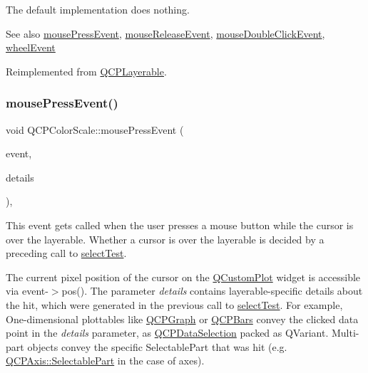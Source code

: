 The default implementation does nothing.

\begin{DoxySeeAlso}{See also}
\hyperlink{class_q_c_p_color_scale_a91f633b97ffcd57fdf8cd814974c20e6}{mouse\+Press\+Event}, \hyperlink{class_q_c_p_color_scale_a6a35dd39ab4e5cb2d7b29ebb4d5b61b0}{mouse\+Release\+Event}, \hyperlink{class_q_c_p_layerable_a4171e2e823aca242dd0279f00ed2de81}{mouse\+Double\+Click\+Event}, \hyperlink{class_q_c_p_color_scale_a63cf19be184f6670c9495ad3a9a1baeb}{wheel\+Event} 
\end{DoxySeeAlso}


Reimplemented from \hyperlink{class_q_c_p_layerable_a9eee1ba47fd69be111059ca3881933e4}{Q\+C\+P\+Layerable}.

\mbox{\label{class_q_c_p_color_scale_a91f633b97ffcd57fdf8cd814974c20e6}} 
\subsubsection{\texorpdfstring{mouse\+Press\+Event()}{mousePressEvent()}}
{\footnotesize\ttfamily void Q\+C\+P\+Color\+Scale\+::mouse\+Press\+Event (\begin{DoxyParamCaption}\item[{Q\+Mouse\+Event $\ast$}]{event,  }\item[{const Q\+Variant \&}]{details }\end{DoxyParamCaption})\hspace{0.3cm}{\ttfamily [protected]}, {\ttfamily [virtual]}}

This event gets called when the user presses a mouse button while the cursor is over the layerable. Whether a cursor is over the layerable is decided by a preceding call to \hyperlink{class_q_c_p_layout_element_ae97f483cccedadbf18ea4525ef240ee4}{select\+Test}.

The current pixel position of the cursor on the \hyperlink{class_q_custom_plot}{Q\+Custom\+Plot} widget is accessible via {\ttfamily event-\/$>$pos()}. The parameter {\itshape details} contains layerable-\/specific details about the hit, which were generated in the previous call to \hyperlink{class_q_c_p_layout_element_ae97f483cccedadbf18ea4525ef240ee4}{select\+Test}. For example, One-\/dimensional plottables like \hyperlink{class_q_c_p_graph}{Q\+C\+P\+Graph} or \hyperlink{class_q_c_p_bars}{Q\+C\+P\+Bars} convey the clicked data point in the {\itshape details} parameter, as \hyperlink{class_q_c_p_data_selection}{Q\+C\+P\+Data\+Selection} packed as Q\+Variant. Multi-\/part objects convey the specific {\ttfamily Selectable\+Part} that was hit (e.\+g. \hyperlink{class_q_c_p_axis_abee4c7a54c468b1385dfce2c898b115f}{Q\+C\+P\+Axis\+::\+Selectable\+Part} in the case of axes).

